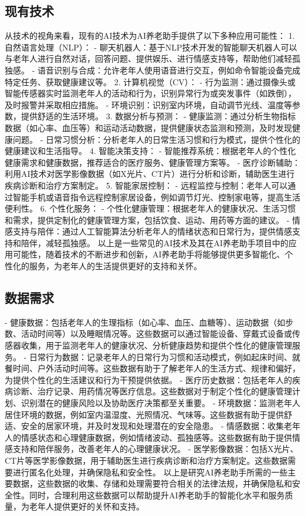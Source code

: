 \subsection{现有技术}
从技术的视角来看，现有的AI技术为AI养老助手提供了以下多种应用可能性：
1. 自然语言处理（NLP）：
- 聊天机器人：基于NLP技术开发的智能聊天机器人可以与老年人进行自然对话，回答问题、提供娱乐、进行情感支持等，帮助他们减轻孤独感。
- 语音识别与合成：允许老年人使用语音进行交互，例如命令智能设备完成特定任务、获取健康建议等。
2. 计算机视觉（CV）：
- 行为监测：通过摄像头或智能传感器实时监测老年人的活动和行为，识别异常行为或突发事件（如跌倒），及时报警并采取相应措施。
- 环境识别：识别室内环境，自动调节光线、温度等参数，提供舒适的生活环境。
3. 数据分析与预测：
  - 健康监测：通过分析生物指标数据（如心率、血压等）和运动活动数据，提供健康状态监测和预测，及时发现健康问题。
  - 日常习惯分析：分析老年人的日常生活习惯和行为模式，提供个性化的健康建议和生活指导。
4. 智能决策支持：
  - 智能推荐系统：根据老年人的个性化健康需求和健康数据，推荐适合的医疗服务、健康管理方案等。
  - 医疗诊断辅助：利用AI技术对医学影像数据（如X光片、CT片）进行分析和诊断，辅助医生进行疾病诊断和治疗方案制定。
5. 智能家居控制：
  - 远程监控与控制：老年人可以通过智能手机或语音指令远程控制家居设备，例如调节灯光、控制家电等，提高生活便利性。
6. 个性化服务：
  - 个性化健康管理：根据老年人的健康状况、生活习惯和需求，提供定制化的健康管理方案，包括饮食、运动、用药等方面的建议。
  - 情感支持与陪伴：通过人工智能算法分析老年人的情绪状态和日常行为，提供情感支持和陪伴，减轻孤独感。
以上是一些常见的AI技术及其在AI养老助手项目中的应用可能性，随着技术的不断进步和创新，AI养老助手将能够提供更多智能化、个性化的服务，为老年人的生活提供更好的支持和关怀。
\subsection{数据需求}
- 健康数据：包括老年人的生理指标（如心率、血压、血糖等）、运动数据（如步数、活动时间等）以及睡眠情况等。这些数据可以通过智能设备、穿戴式设备或传感器收集，用于监测老年人的健康状况、分析健康趋势和提供个性化的健康管理服务。
- 日常行为数据：记录老年人的日常行为习惯和活动模式，例如起床时间、就餐时间、户外活动时间等。这些数据有助于了解老年人的生活方式、规律和偏好，为提供个性化的生活建议和行为干预提供依据。
- 医疗历史数据：包括老年人的疾病诊断、治疗记录、用药情况等医疗信息。这些数据对于制定个性化的健康管理计划、识别潜在的健康风险以及协助医疗决策都至关重要。
- 环境数据：监测老年人居住环境的数据，例如室内温湿度、光照情况、气味等。这些数据有助于提供舒适、安全的居家环境，并及时发现和处理潜在的安全隐患。
- 情感数据：收集老年人的情感状态和心理健康数据，例如情绪波动、孤独感等。这些数据有助于提供情感支持和陪伴服务，改善老年人的心理健康状况。
- 医学影像数据：包括X光片、CT片等医学影像数据，用于辅助医生进行疾病诊断和治疗方案制定。这些数据需要进行匿名化处理，并确保隐私和安全性。
以上是研究AI养老助手所需的一些主要数据，这些数据的收集、存储和处理需要符合相关的法律法规，并确保隐私和安全性。同时，合理利用这些数据可以帮助提升AI养老助手的智能化水平和服务质量，为老年人提供更好的关怀和支持。
